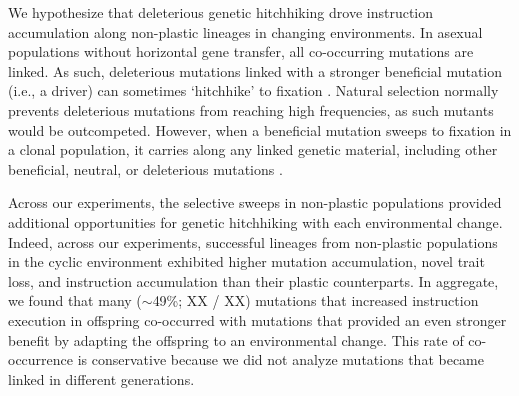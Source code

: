 We hypothesize that deleterious genetic hitchhiking drove  instruction accumulation along non-plastic lineages in changing environments.
In asexual populations without horizontal gene transfer, all co-occurring mutations are linked.
As such, deleterious mutations linked with a stronger beneficial mutation (i.e., a driver) can sometimes `hitchhike' to fixation \citep{smith_hitch-hiking_1974,van_den_bergh_experimental_2018,buskirk_hitchhiking_2017}.
Natural selection normally prevents deleterious mutations from reaching high frequencies, as such mutants would be outcompeted.
However, when a beneficial mutation sweeps to fixation in a clonal population, it carries along any linked genetic material, including other beneficial, neutral, or deleterious mutations  \cite{barton_genetic_2000, smith_hitch-hiking_1974}.

Across our experiments, the selective sweeps in non-plastic populations provided additional opportunities for genetic hitchhiking with each environmental change. 
Indeed, across our experiments, successful lineages from non-plastic populations in the cyclic environment exhibited higher mutation accumulation, novel trait loss, and  instruction accumulation than their plastic counterparts.
In aggregate, we found that many ($\sim$49\%; XX / XX) mutations that increased  instruction execution in offspring co-occurred with mutations that provided an even stronger benefit by adapting the offspring to an environmental change.
This rate of co-occurrence is conservative because we did not analyze mutations that became linked in different generations.


